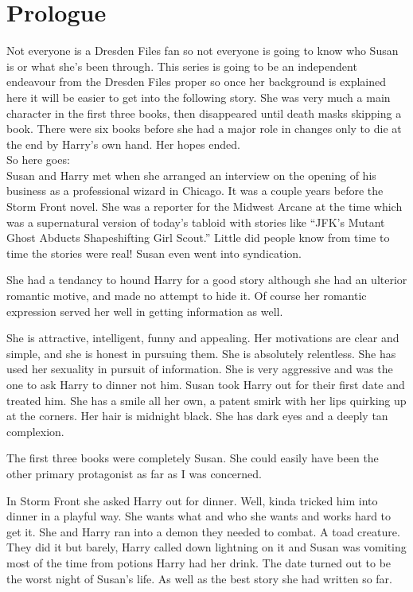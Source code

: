 \documentclass[ebook,12pt,oneside,openany]{memoir}
\begin{document}
\chapter*{Prologue}
{Not everyone is a Dresden Files fan so not everyone is going to know who Susan is or what she's been through. This series is going to be an independent endeavour from the Dresden Files proper so once her background is explained here it will be easier to get into the following story. She was very much a main character in the first three books, then disappeared until death masks skipping a book. There were six books before she had a major role in changes only to die at the end by Harry's own hand. Her hopes ended.\\

So here goes:\\

Susan and Harry met when she arranged an interview on the opening of his business as a professional wizard in Chicago. It was a couple years before the Storm Front novel. She was a reporter for the Midwest Arcane at the time which was a supernatural version of today's tabloid with stories like ``JFK’s Mutant Ghost Abducts Shapeshifting Girl Scout.'' Little did people know from time to time the stories were real! Susan even went into syndication.

She had a tendancy to hound Harry for a good story although she had an ulterior romantic motive, and made no attempt to hide it. Of course her romantic expression served her well in getting information as well.

She is attractive, intelligent, funny and appealing. Her motivations are clear and simple, and she is honest in pursuing them. She is absolutely relentless. She has used her sexuality in pursuit of information. She is very aggressive and was the one to ask Harry to dinner not him. Susan took Harry out for their first date and treated him. She has a smile all her own, a patent smirk with her lips quirking up at the corners. Her hair is midnight black. She has dark eyes and a deeply tan complexion.

The first three books were completely Susan. She could easily have been the other primary protagonist as far as I was concerned.

In Storm Front she asked Harry out for dinner. Well, kinda tricked him into dinner in a playful way. She wants what and who she wants and works hard to get it. She and Harry ran into a demon they needed to combat. A toad creature. They did it but barely, Harry called down lightning on it and Susan was vomiting most of the time from potions Harry had her drink. The date turned out to be the worst night of Susan's life. As well as the best story she had written so far.

}
\end{document}
